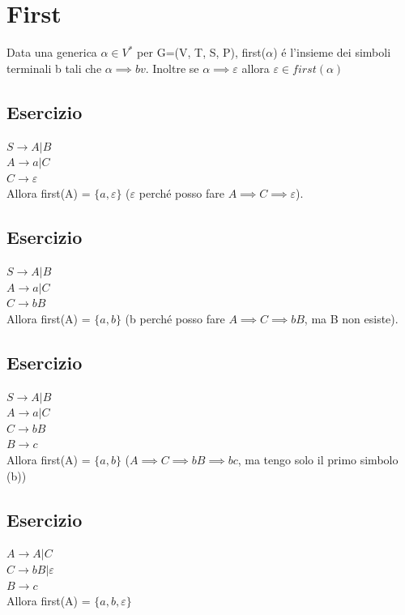 \section{First}
Data una generica $\alpha \in V^*$ per G=(V, T, S, P), first($\alpha$) \'e l'insieme dei simboli terminali b tali che $\alpha \implies bv$.
Inoltre se $\alpha \implies \varepsilon $ allora $\varepsilon \in first(\alpha )$

\subsection{Esercizio}
$S \rightarrow A|B$\\
$A \rightarrow a|C$\\
$C \rightarrow \varepsilon$\\
Allora first(A) = $\{ a, \varepsilon \}$ ($\varepsilon$ perch\'e posso fare $A \implies C \implies \varepsilon $). 

\subsection{Esercizio}
$S \rightarrow A|B$\\
$A \rightarrow a|C$\\
$C \rightarrow bB$\\
Allora first(A) = $\{ a, b \}$ (b perch\'e posso fare $A \implies C \implies bB$, ma B non esiste). 

\subsection{Esercizio}
$S \rightarrow A|B$\\
$A \rightarrow a|C$\\
$C \rightarrow bB$\\
$B \rightarrow c$\\
Allora first(A) = $\{ a, b \}$ ($A \implies C \implies bB \implies bc$, ma tengo solo il primo simbolo (b)) 

\subsection{Esercizio}
$A \rightarrow A|C$\\
$C \rightarrow bB|\varepsilon$\\
$B \rightarrow c$\\
Allora first(A) = $\{ a, b, \varepsilon\}$

